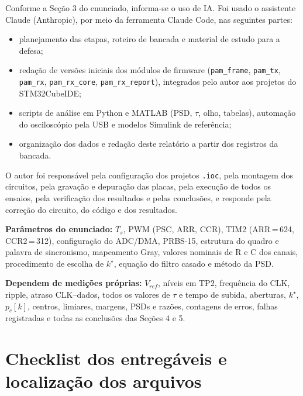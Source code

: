 \documentclass[12pt,a4paper]{article}
\begin{document}
Conforme a Seção 3 do enunciado, informa-se o uso de IA. Foi usado o assistente Claude (Anthropic),
por meio da ferramenta Claude Code, nas seguintes partes:
\begin{itemize}
    \item planejamento das etapas, roteiro de bancada e material de estudo para a defesa;
    \item redação de versões iniciais dos módulos de firmware (\texttt{pam\_frame}, \texttt{pam\_tx},
    \texttt{pam\_rx}, \texttt{pam\_rx\_core}, \texttt{pam\_rx\_report}), integrados pelo autor aos
    projetos do STM32CubeIDE;
    \item scripts de análise em Python e MATLAB (PSD, $\tau$, olho, tabelas), automação do osciloscópio
    pela USB e modelos Simulink de referência;
    \item organização dos dados e redação deste relatório a partir dos registros da bancada.
\end{itemize}
O autor foi responsável pela configuração dos projetos \texttt{.ioc}, pela montagem dos circuitos,
pela gravação e depuração das placas, pela execução de todos os ensaios, pela verificação dos
resultados e pelas conclusões, e responde pela correção do circuito, do código e dos resultados.

\textbf{Parâmetros do enunciado:} $T_s$, PWM (PSC, ARR, CCR), TIM2 (ARR\,=\,624, CCR2\,=\,312),
configuração do ADC/DMA, PRBS-15, estrutura do quadro e palavra de sincronismo, mapeamento Gray,
valores nominais de R e C dos canais, procedimento de escolha de $k^\star$, equação do filtro casado e
método da PSD.

\textbf{Dependem de medições próprias:} $V_{ref}$, níveis em TP2, frequência do CLK, ripple,
atraso CLK--dados, todos os valores de $\tau$ e tempo de subida, aberturas, $k^\star$, $p_c[k]$,
centros, limiares, margens, PSDs e razões, contagens de erros, falhas registradas e todas as
conclusões das Seções 4 e 5.

\appendix
\section{Checklist dos entregáveis e localização dos arquivos}
\end{document}
